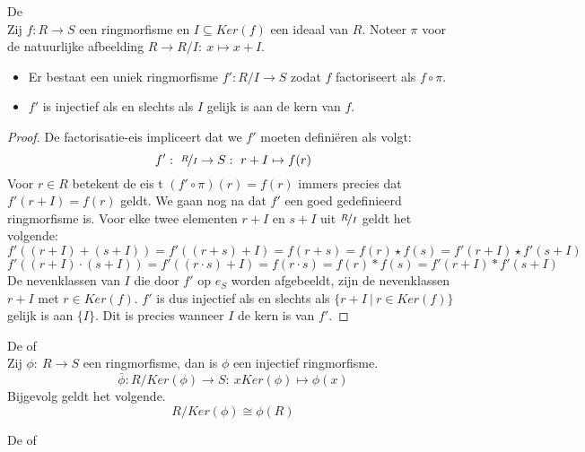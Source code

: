 \documentclass[main.tex]{subfiles}
\begin{document}
\begin{st}
  De \\
  Zij $f: R \rightarrow S$ een ringmorfisme en $I \subseteq Ker(f)$ een ideaal van $R$.
  Noteer $\pi$ voor de natuurlijke afbeelding $R \rightarrow R/I:\ x \mapsto x+I$.
  \begin{itemize}
  \item Er bestaat een uniek ringmorfisme $f': R/I \rightarrow S$ zodat $f$ factoriseert als $f \circ \pi$.
  \item $f'$ is injectief als en slechts als $I$ gelijk is aan de kern van $f$.
  \end{itemize}

  \begin{proof}
    De factorisatie-eis impliceert dat we $f'$ moeten defini\"eren als volgt:
    \[ f':\ \nicefrac{R}{I} \rightarrow S:\ r+I \mapsto f(r) \]
    Voor $r\in R$ betekent de eis t $(f' \circ \pi) (r) = f(r)$ immers precies dat $f'(r+I) = f(r)$ geldt.
    We gaan nog na dat $f'$ een goed gedefinieerd ringmorfisme is.
    Voor elke twee elementen $r+I$ en $s+I$ uit $\nicefrac{R}{I}$ geldt het volgende:
    \[ f'((r+I)+(s+I)) = f'((r+s)+I) = f(r+s) = f(r) \star f(s) = f'(r+I) \star f'(s+I) \]
    \[ f'((r+I) \cdot (s+I)) = f'((r\cdot s) + I) = f(r\cdot s) = f(r) * f(s) = f'(r+I) * f'(s+I) \]
    De nevenklassen van $I$ die door $f'$ op $e_{S}$ worden afgebeeldt, zijn de nevenklassen $r+I$ met $r\in Ker(f)$.
    $f'$ is dus injectief als en slechts als $\{ r+I\ |\ r\in Ker(f)\}$ gelijk is aan $\{I\}$.
    Dit is precies wanneer $I$ de kern is van $f'$.
  \end{proof}
\end{st}

\begin{gev}
  \label{gev:eerste-ringmorfismestelling}
  De  of \\
  Zij $\phi:\ R \rightarrow S$ een ringmorfisme, dan is $\phi$ een injectief ringmorfisme.
  \[ \bar{\phi}: R/Ker(\phi) \rightarrow S:\ xKer(\phi) \mapsto \phi(x) \]
  Bijgevolg geldt het volgende.
  \[ R/Ker(\phi) \cong \phi(R) \]
\end{gev}

\begin{st}
  De  of 
\end{st}
\end{document}
